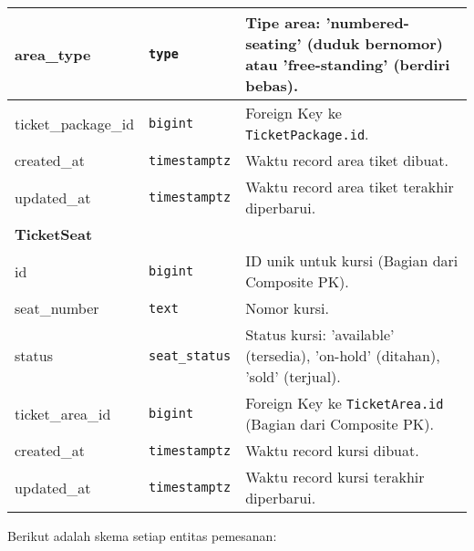 \begin{longtable}{|l|p{}|p{}|}
	\hline
	area\_type           & \texttt{type}         & Tipe area: 'numbered-seating' (duduk bernomor) atau 'free-standing' (berdiri bebas). \\
	\hline
	ticket\_package\_id  & \texttt{bigint}       & Foreign Key ke \texttt{TicketPackage.id}.                                            \\
	\hline
	created\_at          & \texttt{timestamptz}  & Waktu record area tiket dibuat.                                                      \\
	\hline
	updated\_at          & \texttt{timestamptz}  & Waktu record area tiket terakhir diperbarui.                                         \\
	\hline
	\multicolumn{3}{|l|}{\textbf{TicketSeat}}                                                                                           \\
	\hline
	id                   & \texttt{bigint}       & ID unik untuk kursi (Bagian dari Composite PK).                                      \\
	\hline
	seat\_number         & \texttt{text}         & Nomor kursi.                                                                         \\
	\hline
	status               & \texttt{seat\_status} & Status kursi: 'available' (tersedia), 'on-hold' (ditahan), 'sold' (terjual).         \\
	\hline
	ticket\_area\_id     & \texttt{bigint}       & Foreign Key ke \texttt{TicketArea.id} (Bagian dari Composite PK).                    \\
	\hline
	created\_at          & \texttt{timestamptz}  & Waktu record kursi dibuat.                                                           \\
	\hline
	updated\_at          & \texttt{timestamptz}  & Waktu record kursi terakhir diperbarui.                                              \\
\end{longtable}
\endgroup

Berikut adalah skema setiap entitas pemesanan:

